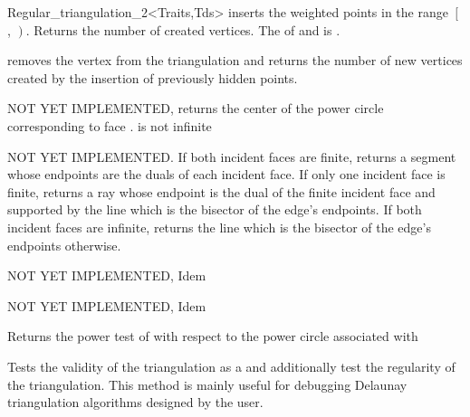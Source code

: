 \begin{ccRefClass}{Regular_triangulation_2<Traits,Tds>}
{inserts the weighted points in the range
 $\left[\right.$, $\left.\right)$.
 Returns the number of created vertices.
 \ccPrecond The  of  and 
 is .}

{removes the vertex from the triangulation and
returns the number of new vertices created by the insertion of previously
hidden points.}


{NOT YET IMPLEMENTED, returns the center of the power circle corresponding to face .
\ccPrecond {} is not infinite}

{NOT YET IMPLEMENTED. If both incident faces are finite, returns a segment whose endpoints are the
duals of each incident face. If only one incident face is finite, returns a
ray whose endpoint is the dual of the finite incident face and supported by
the line which is the bisector of the edge's endpoints. If both incident faces
are infinite, returns the line which is the bisector of the edge's endpoints
otherwise.  }

{NOT YET IMPLEMENTED, Idem}

{NOT YET IMPLEMENTED, Idem}



\ccPredicates
{}
\ccThreeToTwo

{Returns the power test of   with respect to the 
power circle  associated with }



\begin{ccAdvanced}

{ Tests the validity of the triangulation as a 
and additionally test the regularity of the triangulation. This method is
 mainly  useful for debugging Delaunay triangulation algorithms designed by
 the user.}
\end{ccAdvanced}





\end{ccRefClass}

